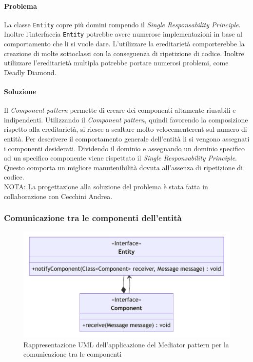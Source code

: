\documentclass[a4paper,12pt]{report}
\begin{document}
\paragraph{Problema} La classe \texttt{Entity} copre più domini rompendo il \textit{Single Responsability Principle}.
Inoltre l'interfaccia \texttt{Entity} potrebbe avere numerose implementazioni in base al comportamento che li si vuole dare.
L'utilizzare la ereditarietà comporterebbe la creazione di molte sottoclassi con la conseguenza di ripetizione di codice.
Inoltre utilizzare l'ereditarietà multipla potrebbe portare numerosi problemi, come Deadly Diamond.

\paragraph{Soluzione} Il \textit{Component pattern} permette di creare dei componenti altamente riusabili e indipendenti.
Utilizzando il \textit{Component pattern}, quindi favorendo la composizione rispetto alla ereditarietà, si riesce a scaltare
molto velocementerent sul numero di entità.
Per descrivere il comportamento generale dell'entità li si vengono assegnati i componenti desiderati.
Dividendo il dominio e assegnando un dominio specifico ad un specifico componente viene rispettato il \textit{Single Responsability Principle}.
Questo comporta un migliore manutenibilità dovuta all'assenza di ripetizione di codice.\\
NOTA: La progettazione alla soluzione del problema è stata fatta in collaborazione con Cecchini Andrea.

\subsubsection{Comunicazione tra le componenti dell'entità}

\begin{figure}[H]
\centering{}
\includegraphics[width=\textwidth]{img/ComponentCommunicationUML}
\caption{Rappresentazione UML dell'applicazione del Mediator pattern per la comunicazione tra le componenti}
\end{figure}
\end{document}

